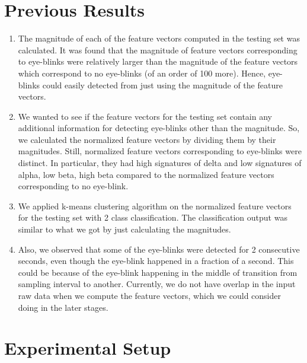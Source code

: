 \documentclass[11pt]{article}
\begin{document}
\section{Previous Results}
	\begin{enumerate}
		\item The magnitude of each of the feature vectors computed in the testing set was calculated. It was found that the magnitude of feature vectors corresponding to eye-blinks were relatively larger than the magnitude of the feature vectors which correspond to no eye-blinks (of an order of 100 more). Hence, eye-blinks could easily detected from just using the magnitude of the feature vectors.

		\item We wanted to see if the feature vectors for the testing set contain any additional information for detecting eye-blinks other than the magnitude. So, we calculated the normalized feature vectors by dividing them by their magnitudes. Still, normalized feature vectors corresponding to eye-blinks were distinct. In particular, they had high signatures of delta and low signatures of alpha, low beta, high beta compared to the normalized feature vectors corresponding to no eye-blink.

		\item We applied k-means clustering algorithm on the normalized feature vectors for the testing set with 2 class classification. The classification output was similar to what we got by just calculating the magnitudes.

		\item Also, we observed that some of the eye-blinks were detected for 2 consecutive seconds, even though the eye-blink happened in a fraction of a second. This could be because of the eye-blink happening in the middle of transition from sampling interval to another. Currently, we do not have overlap in the input raw data when we compute the feature vectors, which we could consider doing in the later stages.
	\end{enumerate}

\section{Experimental Setup}
\end{document}
